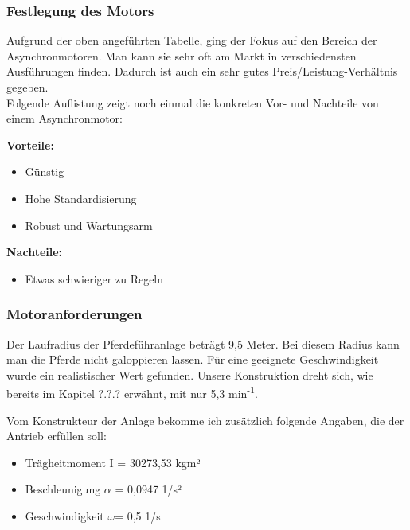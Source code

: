 \documentclass[12pt]{scrreprt} %
\begin{document}
\subsubsection{Festlegung des Motors}
\label{sec:festlegungDesMotors}

Aufgrund der oben angeführten Tabelle, ging der Fokus auf den Bereich der Asynchronmotoren. Man kann sie sehr oft am Markt in verschiedensten Ausführungen finden. Dadurch ist auch ein sehr gutes Preis/Leistung-Verhältnis gegeben. 
\\
Folgende Auflistung zeigt noch einmal die konkreten Vor- und Nachteile von einem Asynchronmotor:


\textbf{Vorteile:}

\begin{itemize}
	\item{Günstig}
	\item{Hohe Standardisierung}
	\item{Robust und Wartungsarm}
\end{itemize}

\textbf{Nachteile:}

\begin{itemize}
	\item{Etwas schwieriger zu Regeln}
\end{itemize}

\subsubsection{Motoranforderungen}
\label{sec:motoranforderungen}

Der Laufradius der Pferdeführanlage beträgt 9,5 Meter. Bei diesem Radius kann man die Pferde nicht galoppieren lassen. 
Für eine geeignete Geschwindigkeit wurde ein realistischer Wert gefunden. %
Unsere Konstruktion dreht sich, wie bereits im Kapitel ?.?.? erwähnt, mit nur 5,3 min\textsuperscript{-1}. 

Vom Konstrukteur der Anlage bekomme ich zusätzlich folgende Angaben, die der Antrieb erfüllen soll:
\\

\begin{itemize}
	\item{Trägheitmoment I = 30273,53 kgm²}
	\item{Beschleunigung $\alpha$ = 0,0947 1/s²}
	\item{Geschwindigkeit $\omega$= 0,5 1/s}
\end{itemize}
\end{document}
